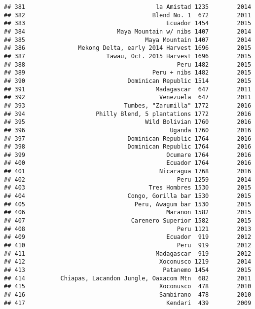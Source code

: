 \documentclass[
]{article}
\begin{document}
\begin{verbatim}
## 381                                     la Amistad 1235        2014
## 382                                    Blend No. 1  672        2011
## 383                                        Ecuador 1454        2015
## 384                          Maya Mountain w/ nibs 1407        2014
## 385                                  Maya Mountain 1407        2014
## 386               Mekong Delta, early 2014 Harvest 1696        2015
## 387                       Tawau, Oct. 2015 Harvest 1696        2015
## 388                                           Peru 1482        2015
## 389                                    Peru + nibs 1482        2015
## 390                             Dominican Republic 1514        2015
## 391                                     Madagascar  647        2011
## 392                                      Venezuela  647        2011
## 393                            Tumbes, "Zarumilla" 1772        2016
## 394                    Philly Blend, 5 plantations 1772        2016
## 395                                  Wild Bolivian 1760        2016
## 396                                         Uganda 1760        2016
## 397                             Dominican Republic 1764        2016
## 398                             Dominican Republic 1764        2016
## 399                                        Ocumare 1764        2016
## 400                                        Ecuador 1764        2016
## 401                                      Nicaragua 1768        2016
## 402                                           Peru 1259        2014
## 403                                   Tres Hombres 1530        2015
## 404                             Congo, Gorilla bar 1530        2015
## 405                               Peru, Awagum bar 1530        2015
## 406                                        Maranon 1582        2015
## 407                              Carenero Superior 1582        2015
## 408                                           Peru 1121        2013
## 409                                        Ecuador  919        2012
## 410                                           Peru  919        2012
## 411                                     Madagascar  919        2012
## 412                                      Xoconusco 1219        2014
## 413                                       Patanemo 1454        2015
## 414          Chiapas, Lacandon Jungle, Oaxacom Mtn  682        2011
## 415                                      Xoconusco  478        2010
## 416                                      Sambirano  478        2010
## 417                                        Kendari  439        2009

\end{verbatim}
\end{document}
